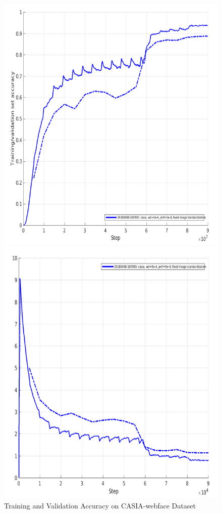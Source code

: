 \documentclass[a4paper,12pt, twoside]{NITKReport}
\begin{document}
\begin{figure}
\centering
\begin{minipage}[b]{0.4\textwidth}
   \includegraphics[width=\textwidth]{csia_acc.png}
    \caption{Training and Validation Accuracy on CASIA-webface Dataset}
    \label{csia_acc}
  \end{minipage}
  \hfill
  \begin{minipage}[b]{0.4\textwidth}
    \includegraphics[width=\textwidth]{csia_loss.png}

\end{minipage}
\end{figure}
\end{document}
